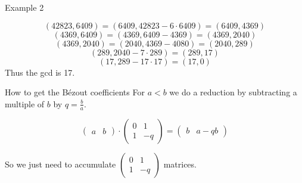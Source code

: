 \documentclass{beamer}
\begin{document}
\begin{frame}{Example 2}

  $$(42823, 6409) = (6409, 42823 - 6 \cdot 6409) = (6409, 4369)$$
  $$(4369, 6409) = (4369, 6409 - 4369) = (4369, 2040)$$
  $$(4369, 2040) = (2040, 4369 - 4080) = (2040, 289)$$
  $$(289, 2040 - 7 \cdot 289) = (289, 17)$$
  $$(17, 289 - 17 \cdot 17) = (17, 0)$$
  Thus the gcd is 17.
\end{frame}

\begin{frame}{How to get the B\'ezout coefficients}
  For $a < b$ we do a reduction by subtracting a multiple of $b$ by $q = \frac{b}{a}$.

  $$\begin{pmatrix} a & b \end{pmatrix} \cdot \begin{pmatrix}0 & 1 \\
    1 & -q \end{pmatrix} = \begin{pmatrix} b & a - qb \end{pmatrix}$$

  So we just need to accumulate $\begin{pmatrix}0 & 1 \\
    1 & -q \end{pmatrix}$ matrices.
\end{frame}
\end{document}
